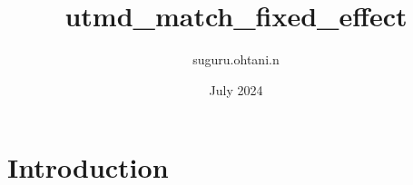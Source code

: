 \documentclass{article}
\title{utmd_match_fixed_effect}
\author{suguru.ohtani.n }
\date{July 2024}
\begin{document}
\maketitle

\section{Introduction}
\end{document}
